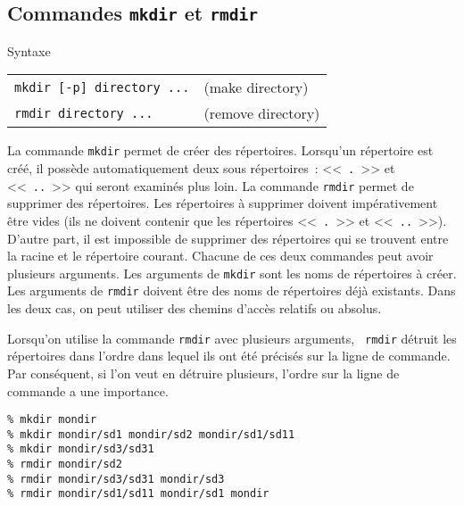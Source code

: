 \subsection{\texorpdfstring{Commandes {\tt mkdir} et {\tt rmdir}}{Commandes mkdir et rmdir}}

\begin{definition}{Syntaxe}
\begin{tabular}{ll}
	\index{mkdir@\texttt{mkdir}}\verb=mkdir [-p] directory ...=	& (make directory) \\
	\index{rmdir@\texttt{rmdir}}\verb=rmdir directory ...=		& (remove directory)\\
\end{tabular}
\end{definition}

La commande {\tt mkdir} permet de cr{\'e}er des r{\'e}pertoires. Lorsqu'un
r{\'e}pertoire est cr{\'e}{\'e}, il poss{\`e}de automatiquement deux sous r{\'e}pertoires~:
<<~{\tt .}~>> et <<~{\tt ..}~>> qui seront examin{\'e}s plus loin. La commande
{\tt rmdir} permet de supprimer des r{\'e}pertoires. Les r{\'e}pertoires {\`a} supprimer
doivent imp{\'e}rativement {\^e}tre vides (ils ne doivent contenir que les
r{\'e}pertoires <<~{\tt .}~>> et <<~{\tt ..}~>>). D'autre part, il est
impossible de supprimer des r{\'e}pertoires qui se trouvent entre la racine
et le r{\'e}pertoire courant. Chacune de ces deux commandes peut avoir
plusieurs arguments. Les arguments de {\tt mkdir} sont les noms de r{\'e}pertoires
{\`a} cr{\'e}er. Les arguments de {\tt rmdir} doivent {\^e}tre des noms de r{\'e}pertoires
d{\'e}j{\`a} existants. Dans les deux cas, on peut utiliser des chemins d'acc{\`e}s
relatifs ou absolus.

\begin{remarque}
Lorsqu'on utilise la commande {\tt rmdir} avec plusieurs arguments, {\tt
rmdir} d{\'e}truit les r{\'e}pertoires dans l'ordre dans lequel ils ont {\'e}t{\'e}
pr{\'e}cis{\'e}s sur la ligne de commande. Par cons{\'e}quent, si l'on veut en
d{\'e}truire plusieurs, l'ordre sur la ligne de commande a une importance.
\end{remarque}

\begin{example}
\begin{verbatim}
% mkdir mondir
% mkdir mondir/sd1 mondir/sd2 mondir/sd1/sd11
% mkdir mondir/sd3/sd31
% rmdir mondir/sd2
% rmdir mondir/sd3/sd31 mondir/sd3
% rmdir mondir/sd1/sd11 mondir/sd1 mondir
\end{verbatim}
\end{example}

